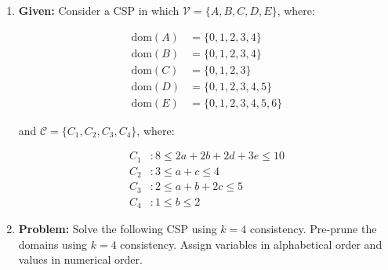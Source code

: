 \begin{example}
    \begin{enumerate}
        \item \textbf{Given:} Consider a CSP in which $\mathcal{V} = \{A, B, C, D, E\}$, where:

        \[
        \begin{aligned}
            \text{dom}(A) &= \{0, 1, 2, 3, 4\} \\
            \text{dom}(B) &= \{0, 1, 2, 3, 4\} \\
            \text{dom}(C) &= \{0, 1, 2, 3\} \\
            \text{dom}(D) &= \{0, 1, 2, 3, 4, 5\} \\
            \text{dom}(E) &= \{0, 1, 2, 3, 4, 5, 6\} 
        \end{aligned}
        \]
        
        and $\mathcal{C} = \{C_1, C_2, C_3, C_4\}$, where:
        
        \[
        \begin{aligned}
            C_1 &: 8 \leq 2a + 2b + 2d + 3e \leq 10 \\
            C_2 &: 3 \leq a + c \leq 4 \\
            C_3 &: 2 \leq a + b + 2c \leq 5 \\
            C_4 &: 1 \leq b \leq 2
        \end{aligned}
        \]
        
        \item \textbf{Problem:} Solve the following CSP using $k = 4$ consistency. Pre-prune the domains using $k = 4$ consistency. Assign variables in alphabetical order and values in numerical order.
    \end{enumerate}
\end{example}
\newpage

